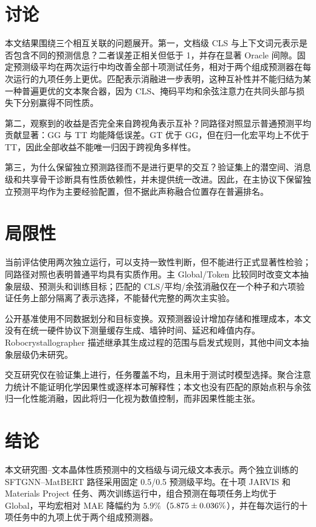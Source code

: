 \documentclass[a4paper,fleqn]{cas-sc}
\renewcommand{\pm}{\mathbin{\hbox{\normalfont ±}}}
\begin{document}
\section{讨论}
本文结果围绕三个相互关联的问题展开。第一，文档级 CLS 与上下文词元表示是否包含不同的预测信息？二者误差正相关但低于 1，并存在显著 Oracle 间隙。固定预测级平均在两次运行中均改善全部十项测试任务，相对于两个组成预测器在每次运行的九项任务上更优。匹配表示消融进一步表明，这种互补性并不能归结为某一种普遍更优的文本聚合器，因为 CLS、掩码平均和余弦注意力在共同头部与损失下分别赢得不同性质。

第二，观察到的收益是否完全来自跨视角表示互补？同路径对照显示普通预测平均贡献显著：GG 与 TT 均能降低误差。GT 优于 GG，但在归一化宏平均上不优于 TT，因此全部收益不能唯一归因于跨视角多样性。

第三，为什么保留独立预测路径而不是进行更早的交互？验证集上的潜空间、消息级和共享骨干诊断具有性质依赖性，并未提供统一改进。因此，在主协议下保留独立预测平均作为主要经验配置，但不据此声称融合位置存在普遍排名。

\section{局限性}
当前评估使用两次独立运行，可以支持一致性判断，但不能进行正式显著性检验；同路径对照也表明普通平均具有实质作用。主 Global/Token 比较同时改变文本抽象层级、预测头和训练目标；匹配的 CLS/平均/余弦消融仅在一个种子和六项验证任务上部分隔离了表示选择，不能替代完整的两次主实验。

公开基准使用不同数据划分和目标变换。双预测器设计增加存储和推理成本，本文没有在统一硬件协议下测量缓存生成、墙钟时间、延迟和峰值内存。Robocrystallographer 描述继承其生成过程的范围与启发式规则，其他中间文本抽象层级仍未研究。

交互研究仅在验证集上进行，任务覆盖不均，且未用于测试时模型选择。聚合注意力统计不能证明化学因果性或逐样本可解释性；本文也没有匹配的原始点积与余弦归一化性能消融，因此将归一化视为数值控制，而非因果性能主张。

\section{结论}
本文研究图--文本晶体性质预测中的文档级与词元级文本表示。两个独立训练的 SFTGNN--MatBERT 路径采用固定 0.5/0.5 预测级平均。在十项 JARVIS 和 Materials Project 任务、两次训练运行中，组合预测在每项任务上均优于 Global，平均宏相对 MAE 降幅约为 $5.9\%$（$5.875\pm0.036\%$），并在每次运行的十项任务中的九项上优于两个组成预测器。
\end{document}
